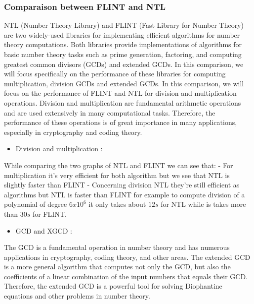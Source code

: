 \subsubsection{Comparaison between FLINT and NTL}
\newline NTL (Number Theory Library) and FLINT (Fast Library for Number Theory) are two widely-used libraries for implementing efficient algorithms for number theory computations. Both libraries provide implementations of algorithms for basic number theory tasks such as prime generation, factoring, and computing greatest common divisors (GCDs) and extended GCDs. In this comparison, we will focus specifically on the performance of these libraries for computing multiplication, division GCDs and extended GCDs.
\newline
\newline In this comparison, we will focus on the performance of FLINT and NTL for division and multiplication operations. Division and multiplication are fundamental arithmetic operations and are used extensively in many computational tasks. Therefore, the performance of these operations is of great importance in many applications, especially in cryptography and coding theory.
\newline
\begin{itemize}
\item Division and multiplication :
\end{itemize}
While comparing the two graphs of NTL and FLINT we can see that:
\newline
- For multiplication it's very efficient for both algorithm but we see that NTL is slightly faster than FLINT
\newline
- Concerning division NTL they're still efficient as algorithms but NTL is faster than FLINT for example to compute division of a polynomial of degree $6x10^6$ it only takes about $12s$ for NTL while is takes more than $30s$ for FLINT.
\newline
\begin{itemize}
\item GCD and XGCD :
\end{itemize}
The GCD is a fundamental operation in number theory and has numerous applications in cryptography, coding theory, and other areas. The extended GCD is a more general algorithm that computes not only the GCD, but also the coefficients of a linear combination of the input numbers that equals their GCD. Therefore, the extended GCD is a powerful tool for solving Diophantine equations and other problems in number theory.
